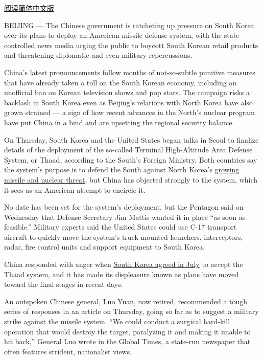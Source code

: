 \href{http://cn.nytimes3xbfgragh.onion/asia-pacific/20170303/china-north-south-korea/}{阅读简体中文版}

BEIJING --- The Chinese government is ratcheting up pressure on South
Korea over its plans to deploy an American missile defense system, with
the state-controlled news media urging the public to boycott South
Korean retail products and threatening diplomatic and even military
repercussions.

China's latest pronouncements follow months of not-so-subtle punitive
measures that have already taken a toll on the South Korean economy,
including an unofficial ban on Korean television shows and pop stars.
The campaign risks a backlash in South Korea even as Beijing's relations
with North Korea have also grown strained --- a sign of how recent
advances in the North's nuclear program have put China in a bind and are
upsetting the regional security balance.

On Thursday, South Korea and the United States began talks in Seoul to
finalize details of the deployment of the so-called Terminal
High-Altitude Area Defense System, or Thaad, according to the South's
Foreign Ministry. Both countries say the system's purpose is to defend
the South against North Korea's
\href{https://www.nytimes3xbfgragh.onion/2017/02/13/world/asia/north-korea-missile-launch-success.html}{growing
missile and nuclear threat}, but China has objected strongly to the
system, which it sees as an American attempt to encircle it.

No date has been set for the system's deployment, but the Pentagon said
on Wednesday that Defense Secretary Jim Mattis wanted it in place ``as
soon as feasible.'' Military experts said the United States could use
C-17 transport aircraft to quickly move the system's truck-mounted
launchers, interceptors, radar, fire control units and support equipment
to South Korea.

China responded with anger when
\href{https://www.nytimes3xbfgragh.onion/2016/07/08/world/asia/south-korea-and-us-agree-to-deploy-missile-defense-system.html}{South
Korea agreed in July} to accept the Thaad system, and it has made its
displeasure known as plans have moved toward the final stages in recent
days.

An outspoken Chinese general, Luo Yuan, now retired, recommended a tough
series of responses in an article on Thursday, going so far as to
suggest a military strike against the missile system. ``We could conduct
a surgical hard-kill operation that would destroy the target, paralyzing
it and making it unable to hit back,'' General Luo wrote in the Global
Times, a state-run newspaper that often features strident, nationalist
views.

